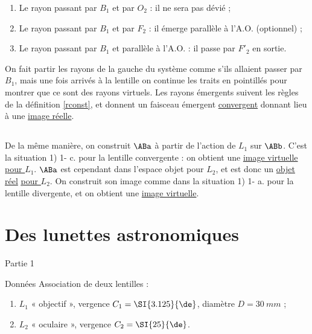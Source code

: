 \documentclass[../main/main.tex]{subfiles}
\begin{document}
\begin{enumerate}
    \item Le rayon passant par $B_1$ et par $O_2$ : il ne sera pas dévié ;
    \item Le rayon passant par $B_1$ et par $F_2$ : il émerge parallèle à l'A.O.
        (optionnel) ;
    \item Le rayon passant par $B_1$ et parallèle à l'A.O. : il passe par $F'_2$
        en sortie.
\end{enumerate}

On fait partir les rayons de la gauche du système comme s'ils allaient passer
par $B_1$, mais une fois arrivés à la lentille on continue les traits en
pointillés pour montrer que ce sont des rayons virtuels. Les rayons émergents
suivent les règles de la définition \ref{rconst}, et donnent un faisceau
émergent \underline{convergent} donnant lieu à une \underline{image réelle}.

\subsection{}
De la même manière, on construit $\ABa$ à partir de l'action de $L_1$ sur
$\ABb$.  C'est la situation 1) 1- c. pour la lentille convergente : on obtient
une \underline{image virtuelle} \underline{\underline{pour $L_1$}}. $\ABa$ est
cependant dans l'espace objet pour $L_2$, et est donc un \underline{objet réel}
\underline{\underline{pour $L_2$}}. On construit son image comme dans la
situation 1) 1- a. pour la lentille divergente, et on obtient une
\underline{image virtuelle}.

\section{Des lunettes astronomiques}
\begin{center}
    \huge Partie 1
\end{center}

\pagebreak

\begin{NCdefi}{Données}
    Association de deux lentilles :
    \begin{enumerate}
        \item $L_1$ « objectif », vergence $C_1 = \SI{3.125}{\de}$, diamètre $D
            = \SI{30}{mm}$ ;
        \item $L_2$ « oculaire », vergence $C_2 = \SI{25}{\de}$.
    \end{enumerate}
\end{NCdefi}
\end{document}
